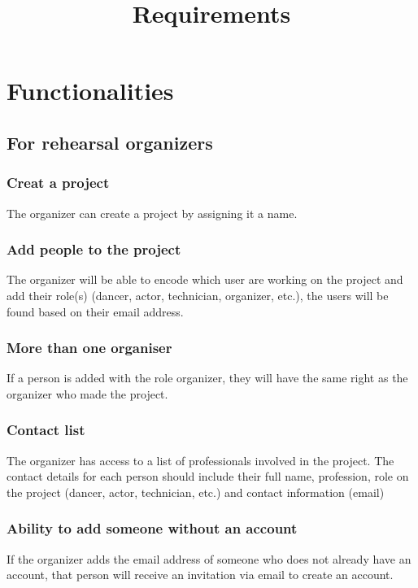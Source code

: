 \documentclass[11pt]{article}
\author{}
\begin{document}
\pagestyle{fancy}
\fancyhead{}


\title{\vspace{-1cm}\huge{Requirements}\vspace{-1.7cm}}
\date{}
\maketitle
\thispagestyle{fancy}
\section{Functionalities}
\subsection{For rehearsal organizers}

\subsubsection{Creat a project}
The organizer can create a project by assigning it a name.

\subsubsection{Add people to the project}
The organizer will be able to encode which user are working on the project and add their role(s) (dancer, actor, technician, organizer, etc.), the users will be found based on their email address.

\subsubsection{More than one organiser}
If a person is added with the role organizer, they will have the same right as the organizer who made the project.

\subsubsection{Contact list}
The organizer has access to a list of professionals involved in the project. The contact details for each person should include their full name, profession, role on the project (dancer, actor, technician, etc.) and contact information (email)

\subsubsection{Ability to add someone without an account}
If the organizer adds the email address of someone who does not already have an account, that person will receive an invitation via email to create an account.
\end{document}

